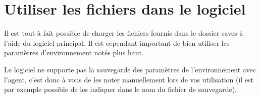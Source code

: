 \section{Utiliser les fichiers dans le logiciel}
Il est tout à fait possible de charger les fichiers fournis dans le dossier saves à l'aide du logiciel principal. Il est cependant important de bien utiliser les paramètres d'environnement notés plus haut.
\par
Le logiciel ne supporte pas la sauvegarde des paramètres de l'environnement avec l'agent, c'est donc à vous de les noter manuellement lors de vos utilisation (il est par exemple possible de les indiquer dans le nom du fichier de sauvegarde).